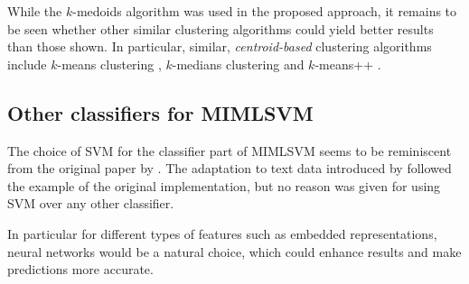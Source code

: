 While the $k$-medoids algorithm was used in the proposed approach, it remains to be seen whether other similar clustering algorithms could yield better results than those shown. In particular, similar, \textit{centroid-based} clustering algorithms include $k$-means clustering \citep{macqueen_1967}, $k$-medians clustering \citep{jain_dubes_1988} and $k$-means++ \citep{arthur_vassilvitskii_2007}.

\subsection{Other classifiers for MIMLSVM}

The choice of SVM for the classifier part of MIMLSVM seems to be reminiscent from the original paper by \cite{zhou_zhang_2006}. The adaptation to text data introduced by \cite{shen_etal_2009} followed the example of the original implementation, but no reason was given for using SVM over any other classifier.

In particular for different types of features such as embedded representations, neural networks would be a natural choice, which could enhance results and make predictions more accurate.

